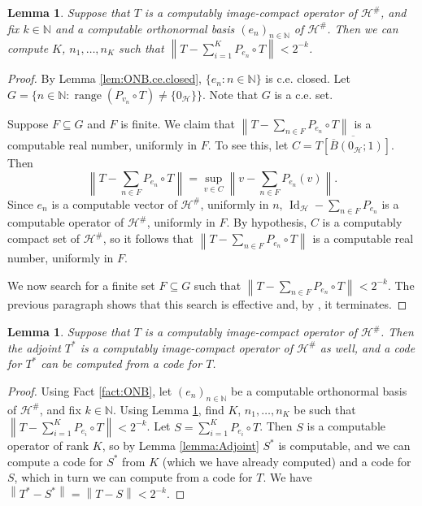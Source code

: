 \documentclass{amsart}
\newcommand{\norm}[1]{\left\| #1 \right\|}
\theoremstyle{plain}
\newtheorem{lemma}[theorem]{Lemma}
\theoremstyle{definition}
\numberwithin{equation}{section}
\begin{document}
\begin{lemma}\label{lem:FiniteRankApproximation1}
Suppose that $T$ is a computably image-compact operator of $\mathcal{H}^\#$, and fix $k \in \mathbb{N}$ and a computable orthonormal basis $(e_n)_{n\in\mathbb{N}}$ of $\mathcal{H}^\#$.  Then we can compute $K$, $n_1, \ldots, n_K$ such that $\norm{T - \sum_{i=1}^KP_{e_n} \circ T} < 2^{-k}$.
\end{lemma}
\begin{proof}
By Lemma \ref{lem:ONB.ce.closed}, $\{e_n : n \in \mathbb{N}\}$ is c.e. closed.  Let $G = \{n \in \mathbb{N} : \operatorname{range}(P_{v_n} \circ T) \neq \{0_{\mathcal{H}}\}\}$.  Note that $G$ is a c.e. set.

Suppose $F \subseteq G$ and $F$ is finite.  We claim that $\norm{T - \sum_{n \in F}P_{e_n} \circ T}$ is a computable real number, uniformly in $F$.  To see this, let $C = \overline{T[\overline{B}(0_{\mathcal{H}}; 1)]}$.  Then
\[\norm{T - \sum_{n \in F}P_{e_n} \circ T} = \sup_{v \in C}\norm{v - \sum_{n \in F}P_{e_n}(v)}.\]
Since $e_n$ is a computable vector of $\mathcal{H}^\#$, uniformly in $n$, $\operatorname{Id}_{\mathcal{H}} - \sum_{n \in F}P_{e_n}$ is a computable operator of $\mathcal{H}^\#$, uniformly in $F$.  By hypothesis, $C$ is a computably compact set of $\mathcal{H}^\#$, so it follows that $\norm{T - \sum_{n \in F}P_{e_n} \circ T}$ is a computable real number, uniformly in $F$.

We now search for a finite set $F \subseteq G$ such that $\norm{T - \sum_{n \in F}P_{e_n} \circ T} < 2^{-k}$.  The previous paragraph shows that this search is effective and, by \cite[Corollary 4.5]{Conway.1990}, it terminates.
\end{proof}

\begin{lemma}
Suppose that $T$ is a computably image-compact operator of $\mathcal{H}^\#$.  Then the adjoint $T^*$ is a computably image-compact operator of $\mathcal{H}^\#$ as well, and a code for $T^*$ can be computed from a code for $T$.
\end{lemma}
\begin{proof}
Using Fact \ref{fact:ONB}, let $(e_n)_{n\in\mathbb{N}}$ be a computable orthonormal basis of $\mathcal{H}^\#$, and fix $k \in \mathbb{N}$.  Using Lemma \ref{lem:FiniteRankApproximation1}, find $K$, $n_1, \ldots, n_K$ be such that $\norm{T - \sum_{i=1}^{K}P_{e_i}\circ T} < 2^{-k}$.  Let $S = \sum_{i=1}^KP_{e_i} \circ T$.  Then $S$ is a computable operator of rank $K$, so by Lemma \ref{lemma:Adjoint} $S^*$ is computable, and we can compute a code for $S^*$ from $K$ (which we have already computed) and a code for $S$, which in turn we can compute from a code for $T$.  We have $\norm{T^*-S^*} = \norm{T - S} < 2^{-k}$.
\end{proof}
\end{document}
